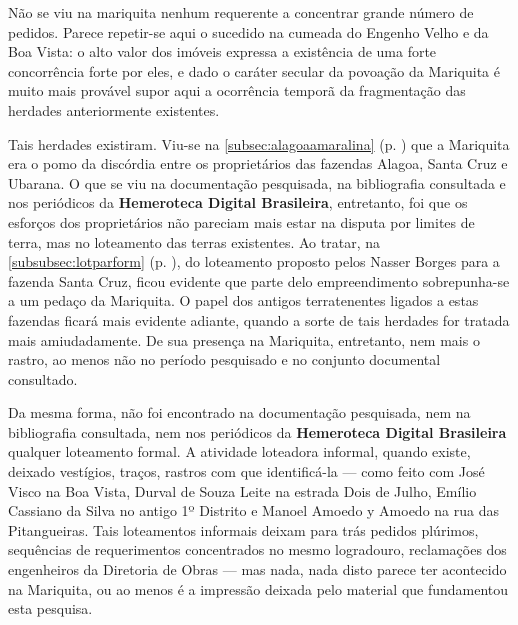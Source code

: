 



Não se viu na mariquita nenhum requerente a concentrar grande número de pedidos. Parece repetir-se aqui o sucedido na cumeada do Engenho Velho e da Boa Vista: o alto valor dos imóveis expressa a existência de uma forte concorrência forte por eles, e dado o caráter secular da povoação da Mariquita é muito mais provável supor aqui a ocorrência temporã da fragmentação das herdades anteriormente existentes.

Tais herdades existiram. Viu-se na \autoref{subsec:alagoaamaralina} (p. \pageref{subsec:alagoaamaralina}) que a Mariquita era o pomo da discórdia entre os proprietários das fazendas Alagoa, Santa Cruz e Ubarana. O que se viu na documentação pesquisada, na bibliografia consultada e nos periódicos da \textbf{Hemeroteca Digital Brasileira}, entretanto, foi que os esforços dos proprietários não pareciam mais estar na disputa por limites de terra, mas no loteamento das terras existentes. Ao tratar, na \autoref{subsubsec:lotparform} (p. \pageref{subsubsec:lotparform}), do loteamento proposto pelos Nasser Borges para a fazenda Santa Cruz, ficou evidente que parte delo empreendimento sobrepunha-se a um pedaço da Mariquita. O papel dos antigos terratenentes ligados a estas fazendas ficará mais evidente adiante, quando a sorte de tais herdades for tratada mais amiudadamente. De sua presença na Mariquita, entretanto, nem mais o rastro, ao menos não no período pesquisado e no conjunto documental consultado.


Da mesma forma, não foi encontrado na documentação pesquisada, nem na bibliografia consultada, nem nos periódicos da \textbf{Hemeroteca Digital Brasileira} qualquer loteamento formal. A atividade loteadora informal, quando existe, deixado vestígios, traços, rastros com que identificá-la --- como feito com José Visco na Boa Vista, Durval de Souza Leite na estrada Dois de Julho, Emílio Cassiano da Silva no antigo 1º Distrito e Manoel Amoedo y Amoedo na rua das Pitangueiras. Tais loteamentos informais deixam para trás pedidos plúrimos, sequências de requerimentos concentrados no mesmo logradouro, reclamações dos engenheiros da Diretoria de Obras --- mas nada, nada disto parece ter acontecido na Mariquita, ou ao menos é a impressão deixada pelo material que fundamentou esta pesquisa. 


